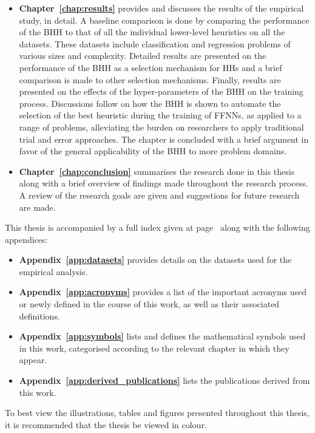 \begin{itemize}
    \item
    \textbf{Chapter~\ref{chap:results}} provides and discusses the results of
    the empirical study, in detail. A baseline comparison is done by comparing
    the performance of the \Ac{BHH} to that of all the individual lower-level
    heuristics on all the datasets. These datasets include classification and
    regression problems of various sizes and complexity.  Detailed results are
    presented on the performance of the \Ac{BHH} as a selection mechanism for
    \acp{HH} and a brief comparison is made to other selection mechanisms.
    Finally, results are presented on the effects of the hyper-parameters of the
    \Ac{BHH} on the training process. Discussions follow on how the \Ac{BHH} is
    shown to automate the selection of the best heuristic during the training of
    \acp{FFNN}, as applied to a range of problems, alleviating the burden on
    researchers to apply traditional trial and error approaches. The chapter is
    concluded with a brief argument in favor of the general applicability of the
    \Ac{BHH} to more problem domains.

	\item
    \textbf{Chapter~\ref{chap:conclusion}} summarises the research done in this
    thesis along with a brief overview of findings made throughout the research
    process. A review of the research goals are given and suggestions for future
    research are made.
\end{itemize}

This thesis is accompanied by a full index given at page~\pageref{index} along with the following appendices:

\begin{itemize}
	\item
    \textbf{Appendix~\ref{app:datasets}} provides details on the datasets used
    for the empirical analysis.

 	\item
    \textbf{Appendix~\ref{app:acronyms}} provides a list of the important
    acronyms used or newly defined in the course of this work, as well as their
    associated definitions.

 	\item
    \textbf{Appendix~\ref{app:symbols}} lists and defines the mathematical
    symbols used in this work, categorised according to the relevant chapter
    in which they appear.

 	\item
    \textbf{Appendix~\ref{app:derived_publications}} lists the publications
    derived from this work.
 \end{itemize}

To best view the illustrations, tables and figures presented throughout this
thesis, it is recommended that the thesis be viewed in colour.

